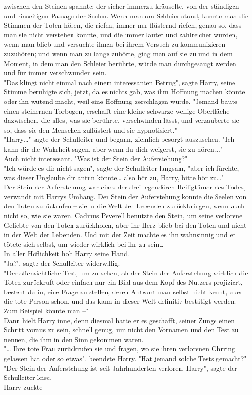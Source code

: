 {zwischen den Steinen spannte; der sicher immerzu kräuselte, von der ständigen und einseitigen Passage der Seelen. Wenn man am Schleier stand, konnte man die Stimmen der Toten hören, die riefen, immer nur flüsternd riefen, genau so, dass man sie nicht verstehen konnte, und die immer lauter und zahlreicher wurden, wenn man blieb und versuchte ihnen bei ihrem Versuch zu kommunizieren zuzuhören; und wenn man zu lange zuhörte, ging man auf sie zu und in dem Moment, in dem man den Schleier berührte, würde man durchgesaugt werden und für immer verschwunden sein.\\ "Das klingt nicht einmal nach einem interessanten Betrug", sagte Harry, seine Stimme beruhigte sich, jetzt, da es nichts gab, was ihm Hoffnung machen könnte oder ihn wütend macht, weil eine Hoffnung zerschlagen wurde. "Jemand baute einen steinernen Torbogen, erschafft eine kleine schwarze wellige Oberfläche dazwischen, die alles, was sie berührte, verschwinden lässt, und verzauberte sie so, dass sie den Menschen zuflüstert und sie hypnotisiert."\\ "Harry…" sagte der Schulleiter und begann, ziemlich besorgt auszusehen. "Ich kann dir die Wahrheit sagen, aber wenn du dich weigerst, sie zu hören…."\\ Auch nicht interessant. "Was ist der Stein der Auferstehung?"\\ "Ich würde es dir nicht sagen", sagte der Schulleiter langsam, "aber ich fürchte, was dieser Unglaube dir antun könnte… also hör zu, Harry, bitte hör zu…"\\ Der Stein der Auferstehung war eines der drei legendären Heiligtümer des Todes, verwandt mit Harrys Umhang. Der Stein der Auferstehung konnte die Seelen von den Toten zurückrufen -- sie in die Welt der Lebenden zurückbringen, wenn auch nicht so, wie sie waren. Cadmus Peverell benutzte den Stein, um seine verlorene Geliebte von den Toten zurückholen, aber ihr Herz blieb bei den Toten und nicht in der Welt der Lebenden. Und mit der Zeit machte es ihn wahnsinnig und er tötete sich selbst, um wieder wirklich bei ihr zu sein…\\ In aller Höflichkeit hob Harry seine Hand.\\ "Ja?", sagte der Schulleiter widerwillig.\\ "Der offensichtliche Test, um zu sehen, ob der Stein der Auferstehung wirklich die Toten zurückruft oder einfach nur ein Bild aus dem Kopf des Nutzers projiziert, besteht darin, eine Frage zu stellen, deren Antwort man selbst nicht kennt, aber die tote Person schon, und das kann in dieser Welt definitiv bestätigt werden. Zum Beispiel könnte man --"\\ Dann hielt Harry inne, denn diesmal hatte er es geschafft, seiner Zunge einen Schritt voraus zu sein, schnell genug, um nicht den Vornamen und den Test zu nennen, die ihm in den Sinn gekommen waren.\\ "… Ihre tote Frau zurückrufen sie und fragen, wo sie ihren verlorenen Ohrring gelassen hat oder so etwas", beendete Harry. "Hat jemand solche Tests gemacht?"\\ "Der Stein der Auferstehung ist seit Jahrhunderten verloren, Harry", sagte der Schulleiter leise.\\ Harry zuckte }
